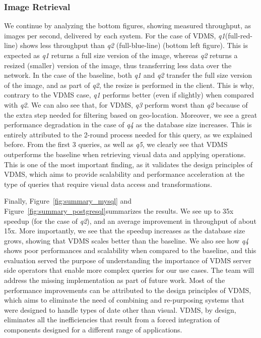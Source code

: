 \subsubsection{Image Retrieval}

We continue by analyzing the bottom figures, showing measured throughput,
as images per second, delivered by each system.
For the case of VDMS, \textit{q1}(full-red-line) shows less throughput
than \textit{q2} (full-blue-line) (bottom left figure).
This is expected as \textit{q1} returns a full size version of the image,
whereas \textit{q2} returns a resized (smaller) version of the image,
thus transferring less data over the network.
In the case of the baseline, both \textit{q1} and \textit{q2} transfer
the full size version of the image, and as part of \textit{q2},
the resize is performed in the client.
This is why, contrary to the VDMS case, \textit{q1} performs better (even if slightly)
when compared with \textit{q2}.
We can also see that, for VDMS, \textit{q3} perform worst than \textit{q2} because
of the extra step needed for filtering based on geo-location.
Moreover, we see a great performance degradation in the case of \textit{q4} as the
database size increases.
This is entirely attributed to the 2-round process needed for this query,
as we explained before.
From the first 3 queries, as well as \textit{q5},
we clearly see that VDMS outperforms the baseline
when retrieving visual data and applying operations.
This is one of the most important finding, as it validates the design principles
of VDMS, which aims to provide scalability and performance acceleration
at the type of queries that require visual data access and transformations.



Finally, Figure~\ref{fig:summary_mysql} and
Figure~\ref{fig:summary_postgresql}summarizes the results.
We see up to 35x speedup (for the case of \textit{q2}),
and an average improvement in throughput of about 15x.
More importantly, we see that the speedup increases as the database size grows,
showing that VDMS scales better than the baseline.
We also see how \textit{q4} shows poor performances and scalability
when compared to the baseline, and this evaluation served the
purpose of understanding the importance of VDMS server side operators
that enable more complex queries for our use cases.
The team will address the missing implementation as part of future work.
Most of the performance improvements can be attributed to the design
principles of VDMS, which aims to eliminate the need of combining and
re-purposing systems that were designed to handle types of date other than visual.
VDMS, by design, eliminates all the inefficiencies that result
from a forced integration of components designed for a
different range of applications.



% 



% 

